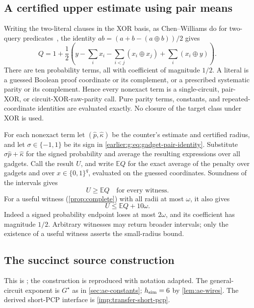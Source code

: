 \subsection{A certified upper estimate using pair means}

Writing the two-literal clauses in the XOR basis, as Chen--Williams
do for two-query predicates~\cite[proof of Theorem~5]{CW19}, the
identity $ab=(a+b-(a\oplus b))/2$ gives
\begin{equation}\label{earlier:g:eq:gadget-pair-identity}
 Q=1+\frac12\left(
 y-\sum_i x_i-\sum_{i<j}(x_i\oplus x_j)
                 +\sum_i(x_i\oplus y)\right).
\end{equation}
There are ten probability terms, all with coefficient of magnitude
$1/2$. A literal is a guessed Boolean proof coordinate or its
complement, or a prescribed systematic parity or its complement. Hence every nonexact
term is a single-circuit, pair-XOR, or circuit-XOR-raw-parity call.
Pure parity terms, constants, and repeated-coordinate identities are
evaluated exactly. No closure of the target class under XOR is used.

For each nonexact term let $(\widehat p,\widehat\kappa)$ be the
counter's estimate and certified radius, and let $\sigma\in\{-1,1\}$
be its sign in \cref{earlier:g:eq:gadget-pair-identity}. Substitute
$\sigma\widehat p+\widehat\kappa$ for the signed probability and
average the resulting expressions over all gadgets. Call the result
$U$, and write $\mathbb E Q$ for the exact average of the penalty over
gadgets and over $x\in\{0,1\}^q$, evaluated on the guessed coordinates.
Soundness of the intervals gives
\begin{equation}\label{earlier:g:eq:gadget-upper}
 U\ge\mathbb E Q\quad\text{for every witness}.
\end{equation}
For a useful witness (\cref{prop:complete}) with all radii at most
$\omega$, it also gives
\begin{equation}\label{earlier:g:eq:gadget-upper-complete}
 U\le\mathbb E Q+10\omega.
\end{equation}
Indeed a signed probability endpoint loses at most $2\omega$, and
its coefficient has magnitude $1/2$. Arbitrary witnesses may return
broader intervals; only the existence of a useful witness asserts the
small-radius bound.



\subsection{The succinct source construction}\label{earlier:source-construction}
This is \cite[Section~11.4]{NagCG}; the construction is reproduced
with notation adapted. The general-circuit exponent is \({G^\star}\)
as in \cref{sec:ae-constants}; \(h_{\rm sim}=6\) by
\cref{lem:ae-wires}. The derived short-PCP interface is
\cref{imp:transfer-short-pcp}.

